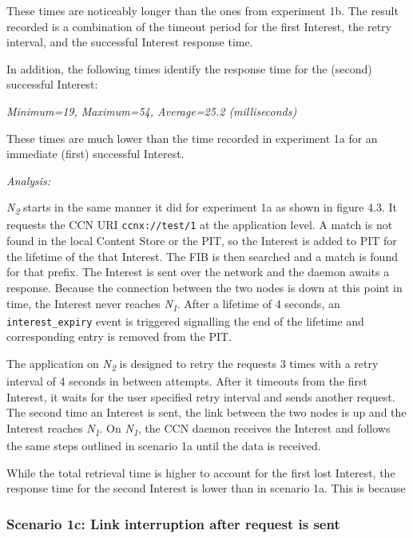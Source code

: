 \documentclass[a4paper,12pt]{report}      %
\begin{document}
These times are noticeably longer than the ones from experiment 1b. The result recorded is a combination of the timeout period for
the first Interest, the retry interval, and the successful Interest response time.

In addition, the following times identify the response time for the (second) successful Interest:
\begin{center}\textsl{Minimum=19, Maximum=54, Average=25.2 (milliseconds)}\end{center}
These times are much lower than the time recorded in experiment 1a for an immediate (first) successful
Interest.

\vspace*{1\baselineskip}\noindent\emph{Analysis:}

 \emph{N\textsubscript{2}} starts in the same manner it did for experiment 1a as shown in figure 4.3. It requests the CCN URI
\verb!ccnx://test/1! at the application level. A match is not found in the local Content Store or the PIT, so
the Interest is added to PIT for the lifetime of the that Interest. 
The FIB is then searched and a match is found for that prefix. The Interest is sent over the network and
the daemon awaits a response. Because the connection between the two nodes is down at this point in
time, the Interest never reaches  \emph{N\textsubscript{1}}. After a lifetime of 4 seconds, an \verb!interest_expiry!
 event is triggered signalling the end of the lifetime and corresponding entry is removed from the PIT.

The application on \emph{N\textsubscript{2}} is designed to retry the requests 3 times with a retry interval of 4 seconds in
between attempts. After it timeouts from the first Interest, it waits for the user specified retry
interval and sends another request. The second time an Interest is sent, the link between the two
nodes is up and the Interest reaches \emph{N\textsubscript{1}}. On \emph{N\textsubscript{1}}, the CCN daemon receives the Interest and follows the same steps outlined in scenario 1a until the data is received. 

While the total retrieval time is higher to account for the first lost Interest, the response time for the second Interest is lower than in scenario 1a. This is because %

\subsubsection{Scenario 1c: Link interruption after request is sent}
\end{document}
